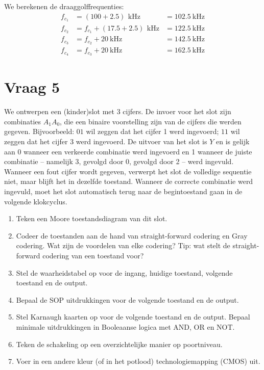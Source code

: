 \documentclass{kuburgiearticle}
\begin{document}
\begin{enumerate}
		We berekenen de draaggolffrequenties: \begin{align*}
			f_{c_1} &= (100 + 2.5) \, \SI{}{\kilo\hertz} &= \SI{102.5}{\kilo\hertz} \\
			f_{c_2} &= f_{c_1} + (17.5 + 2.5) \, \SI{}{\kilo\hertz} &= \SI{122.5}{\kilo\hertz} \\
			f_{c_3} &= f_{c_2} + \SI{20}{\kilo\hertz} &= \SI{142.5}{\kilo\hertz} \\
			f_{c_4} &= f_{c_3} + \SI{20}{\kilo\hertz} &= \SI{162.5}{\kilo\hertz}
		\end{align*}
	\end{enumerate}

	\newpage
	\section*{Vraag 5}

	We ontwerpen een (kinder)slot met 3 cijfers. De invoer voor het slot zijn combinaties \(A_1 A_0\), die een binaire voorstelling zijn van de cijfers die werden gegeven. Bijvoorbeeld: \(01\) wil zeggen dat het cijfer 1 werd ingevoerd; \(11\) wil zeggen dat het cijfer 3 werd ingevoerd. De uitvoer van het slot is \(Y\) en is gelijk aan 0 wanneer een verkeerde combinatie werd ingevoerd en 1 wanneer de juiste combinatie -- namelijk 3, gevolgd door 0, gevolgd door 2 -- werd ingevuld. Wanneer een fout cijfer wordt gegeven, verwerpt het slot de volledige sequentie niet, maar blijft het in dezelfde toestand. Wanneer de correcte combinatie werd ingevuld, moet het slot automatisch terug naar de begintoestand gaan in de volgende klokcyclus.

	\begin{enumerate}
		\item Teken een Moore toestandsdiagram van dit slot.
		\item Codeer de toestanden aan de hand van straight-forward codering en Gray codering. Wat zijn de voordelen van elke codering? Tip: wat stelt de straight-forward codering van een toestand voor?
		\item Stel de waarheidstabel op voor de ingang, huidige toestand, volgende toestand en de output.
		\item Bepaal de SOP uitdrukkingen voor de volgende toestand en de output.
		\item Stel Karnaugh kaarten op voor de volgende toestand en de output. Bepaal minimale uitdrukkingen in Booleaanse logica met AND, OR en NOT.
		\item Teken de schakeling op een overzichtelijke manier op poortniveau.
		\item Voer in een andere kleur (of in het potlood) technologiemapping (CMOS) uit.
	\end{enumerate}
\end{document}
